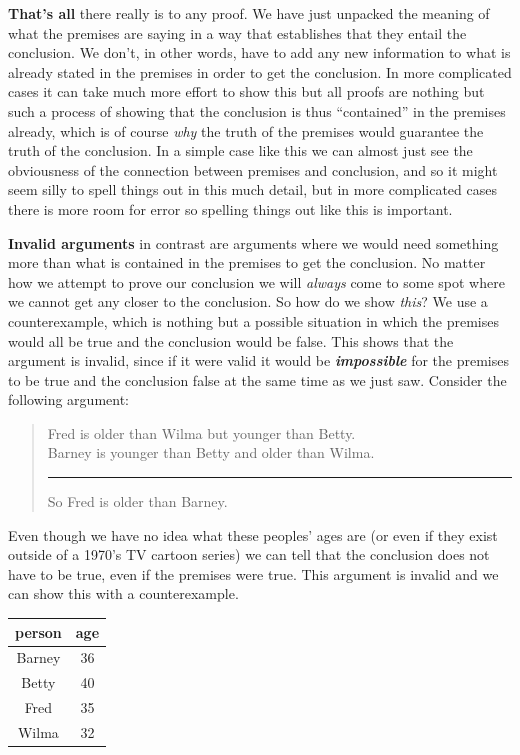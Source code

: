 \documentclass[]{book}
\newenvironment{argument}{\begin{quote}\normalsize}{\end{quote}}
\begin{document}
\textbf{That's all} there really is to any proof. We have just unpacked the meaning of what the premises are saying in a way that establishes that they entail the conclusion. We don't, in other words, have to add any new information to what is already stated in the premises in order to get the conclusion. In more complicated cases it can take much more effort to show this but all proofs are nothing but such a process of showing that the conclusion is thus ``contained'' in the premises already, which is of course \emph{why} the truth of the premises would guarantee the truth of the conclusion. In a simple case like this we can almost just see the obviousness of the connection between premises and conclusion, and so it might seem silly to spell things out in this much detail, but in more complicated cases there is more room for error so spelling things out like this is important.

\textbf{Invalid arguments} in contrast are arguments where we would need something more than what is contained in the premises to get the conclusion. No matter how we attempt to prove our conclusion we will \emph{always} come to some spot where we cannot get any closer to the conclusion. So how do we show \emph{this}? We use a counterexample, which is nothing but a possible situation in which the premises would all be true and the conclusion would be false. This shows that the argument is invalid, since if it were valid it would be \textbf{\emph{impossible}} for the premises to be true and the conclusion false at the same time as we just saw. Consider the following argument:

\begin{argument}
Fred is older than Wilma but younger than Betty.\\
Barney is younger than Betty and older than Wilma.\\

\begin{center}\rule{0.5\linewidth}{\linethickness}\end{center}

So Fred is older than Barney.
\end{argument}

Even though we have no idea what these peoples' ages are (or even if they exist outside of a 1970's TV cartoon series) we can tell that the conclusion does not have to be true, even if the premises were true. This argument is invalid and we can show this with a counterexample.

\begin{longtable}[]{@{}cc@{}}
\toprule
person & age\tabularnewline
\midrule
\endhead
Barney & 36\tabularnewline
Betty & 40\tabularnewline
Fred & 35\tabularnewline
Wilma & 32\tabularnewline
\bottomrule
\end{longtable}
\end{document}
